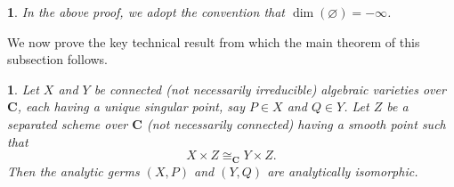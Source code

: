 \documentclass[10pt,a4paper]{amsart}
\numberwithin{equation}{section}
\numberwithin{figure}{section}
\newtheorem{thm}{\protect\theoremname}
\newtheorem{rem}{\protect\remarkname}
\providecommand{\theoremname}{Theorem}
\providecommand{\remarkname}{Remark}
\numberwithin{equation}{section}
\newcommand{\C}{\mathbf{C}}
\begin{document}
\begin{rem}
In the above proof, we adopt the convention that $\dim(\varnothing)=-\infty$.
\end{rem}

We now prove the key technical result from which the main theorem of this subsection follows.

\begin{thm}\label{Thm: Our main cancellation theorem}
Let $X$ and $Y$ be connected (not necessarily irreducible) algebraic varieties over $\C$, each having a unique singular point, say $P\in X$ and $Q\in Y$. Let $Z$ be a separated scheme over $\C$ (not necessarily connected) having a smooth point such that
\[
X\times Z \cong_{\C} Y\times Z.
\]
Then the analytic germs $(X,P)$ and $(Y,Q)$ are analytically isomorphic.
\end{thm}
\end{document}
